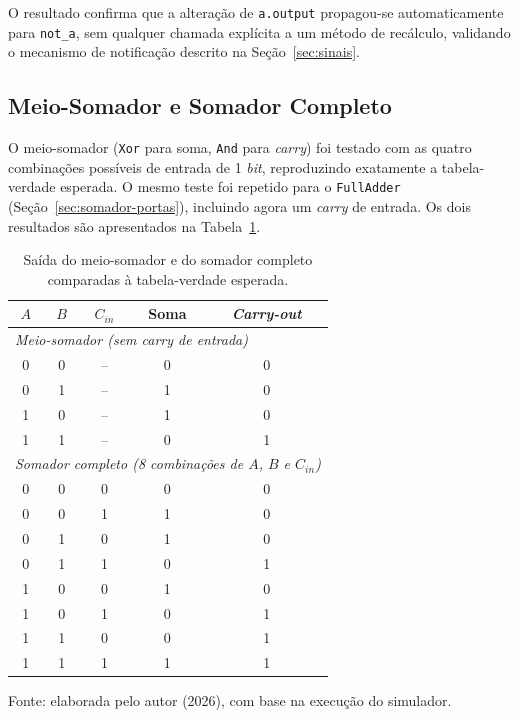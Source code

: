 O resultado confirma que a alteração de \texttt{a.output} propagou-se automaticamente para \texttt{not\_a}, sem qualquer chamada explícita a um método de recálculo, validando o mecanismo de notificação descrito na Seção~\ref{sec:sinais}.

\subsection{Meio-Somador e Somador Completo}

O meio-somador (\texttt{Xor} para soma, \texttt{And} para \textit{carry}) foi testado com as quatro combinações possíveis de entrada de 1 \textit{bit}, reproduzindo exatamente a tabela-verdade esperada. O mesmo teste foi repetido para o \texttt{FullAdder} (Seção~\ref{sec:somador-portas}), incluindo agora um \textit{carry} de entrada. Os dois resultados são apresentados na Tabela~\ref{tab:somadores}.

\begin{table}[H]
\centering
\caption{Saída do meio-somador e do somador completo comparadas à tabela-verdade esperada.}
\label{tab:somadores}
\begin{tabular}{ccc|cc}
\hline
$A$ & $B$ & $C_{in}$ & Soma & \textit{Carry-out} \\
\hline
\multicolumn{5}{l}{\textit{Meio-somador (sem carry de entrada)}} \\
\hline
0 & 0 & -- & 0 & 0 \\
0 & 1 & -- & 1 & 0 \\
1 & 0 & -- & 1 & 0 \\
1 & 1 & -- & 0 & 1 \\
\hline
\multicolumn{5}{l}{\textit{Somador completo (8 combinações de $A$, $B$ e $C_{in}$)}} \\
\hline
0 & 0 & 0 & 0 & 0 \\
0 & 0 & 1 & 1 & 0 \\
0 & 1 & 0 & 1 & 0 \\
0 & 1 & 1 & 0 & 1 \\
1 & 0 & 0 & 1 & 0 \\
1 & 0 & 1 & 0 & 1 \\
1 & 1 & 0 & 0 & 1 \\
1 & 1 & 1 & 1 & 1 \\
\hline
\end{tabular}
\begin{center}
\footnotesize Fonte: elaborada pelo autor (2026), com base na execução do simulador.
\end{center}
\end{table}

